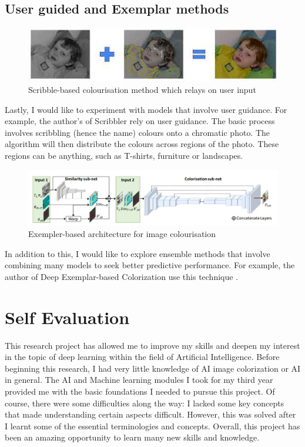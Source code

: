 \subsection{User guided and Exemplar methods}
\begin{figure}[H]
    \centering
    \includegraphics[width=1\columnwidth]{sections/figures/scribble_based_colourisation.jpg}
    \caption{Scribble-based colourisation method which relays on user input \cite{deepimagecolorizationwithuserguidence}}
    \label{fig:my_label}
\end{figure}
Lastly, I would like to experiment with models that involve user guidance. For example, the author's of Scribbler rely on user guidance. The basic process involves scribbling (hence the name) colours onto a chromatic photo. The algorithm will then distribute the colours across regions of the photo. These regions can be anything, such as T-shirts, furniture or landscapes. 

\begin{figure}[H]
    \centering
    \includegraphics[width=1\columnwidth]{sections/figures/deep_exempler_based_architecture.JPG}
    \caption{Exempler-based architecture for image colourisation \cite{DBLP:journals/corr/abs-1807-06587}}
    \label{fig:my_label}
\end{figure}

In addition to this, I would like to explore ensemble methods that involve combining many models to seek better predictive performance. For example, the author of Deep Exemplar-based Colorization use this technique \cite{DBLP:journals/corr/abs-1807-06587}. 

\section{Self Evaluation}
This research project has allowed me to improve my skills and deepen my interest in the topic of deep learning within the field of Artificial Intelligence. Before beginning this research, I had very little knowledge of AI image colorization or AI in general. The AI and Machine learning modules I took for my third year provided me with the basic foundations I needed to pursue this project. Of course, there were some difficulties along the way: I lacked some key concepts that made understanding certain aspects difficult. However, this was solved after I learnt some of the essential terminologies and concepts. Overall, this project has been an amazing opportunity to learn many new skills and knowledge.

